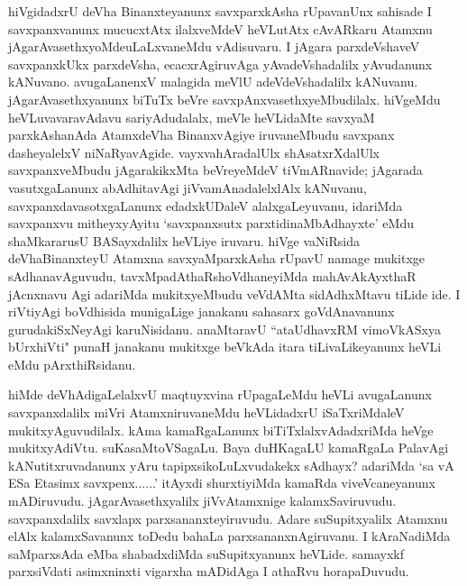 \begin{artha}
hiVgidadxrU deVha Binanxteyanunx savxparxkAsha rUpavanUnx sahisade I savxpanxvanunx mucucxtAtx ilalxveMdeV heVLutAtx cAvARkaru Atamxnu jAgarAvasethxyoMdeuLaLxvaneMdu vAdisuvaru. I jAgara parxdeVshaveV savxpanxkUkx parxdeVsha, ecacxrAgiruvAga yAvadeVshadalilx yAvudanunx kANuvano. avugaLanenxV malagida meVlU adeVdeVshadalilx kANuvanu. jAgarAvasethxyanunx biTuTx beVre savxpAnxvasethxyeMbudilalx. hiVgeMdu heVLuvavaravAdavu sariyAdudalalx, meVle heVLidaMte savxyaM parxkAshanAda AtamxdeVha BinanxvAgiye iruvaneMbudu savxpanx dasheyalelxV niNaRyavAgide. vayxvahAradalUlx shAsatxrXdalUlx savxpanxveMbudu jAgarakikxMta beVreyeMdeV tiVmARnavide; jAgarada vasutxgaLanunx abAdhitavAgi jiVvamAnadalelxlAlx kANuvanu, savxpanxdavasotxgaLanunx edadxkUDaleV alalxgaLeyuvanu, idariMda savxpanxvu mitheyxyAyitu `savxpanxsutx parxtidinaMbAdhayxte' eMdu shaMkararusU BASayxdalilx heVLiye iruvaru. hiVge vaNiRsida deVhaBinanxteyU Atamxna savxyaMparxkAsha rUpavU namage mukitxge sAdhanavAguvudu, tavxMpadAthaRshoVdhaneyiMda mahAvAkAyxthaR jAcnxnavu Agi adariMda mukitxyeMbudu veVdAMta sidAdhxMtavu tiLide ide. I riVtiyAgi boVdhisida munigaLige janakanu sahasarx goVdAnavanunx gurudakiSxNeyAgi karuNisidanu. anaMtaravU ``ataUdhavxRM vimoVkASxya bUrxhiVti" punaH janakanu mukitxge beVkAda itara tiLivaLikeyanunx heVLi eMdu pArxthiRsidanu. 
\end{artha}%


\begin{artha}
hiMde deVhAdigaLelalxvU maqtuyxvina rUpagaLeMdu heVLi avugaLanunx savxpanxdalilx miVri AtamxniruvaneMdu heVLidadxrU iSaTxriMdaleV mukitxyAguvudilalx. kAma kamaRgaLanunx biTiTxlalxvAdadxriMda heVge mukitxyAdiVtu. suKasaMtoVSagaLu. Baya duHKagaLU kamaRgaLa PalavAgi kANutitxruvadanunx yAru tapipxsikoLuLxvudakekx sAdhayx? adariMda `sa vA ESa Etasimx savxpenx......' itAyxdi shurxtiyiMda kamaRda viveVcaneyanunx mADiruvudu. jAgarAvasethxyalilx jiVvAtamxnige kalamxSaviruvudu. savxpanxdalilx savxlapx parxsananxteyiruvudu. Adare suSupitxyalilx Atamxnu elAlx kalamxSavanunx toDedu bahaLa parxsananxnAgiruvanu. I kAraNadiMda saMparxsAda eMba shabadxdiMda suSupitxyanunx heVLide. samayxkf parxsiVdati asimxninxti vigarxha mADidAga I athaRvu horapaDuvudu. 
\end{artha}

